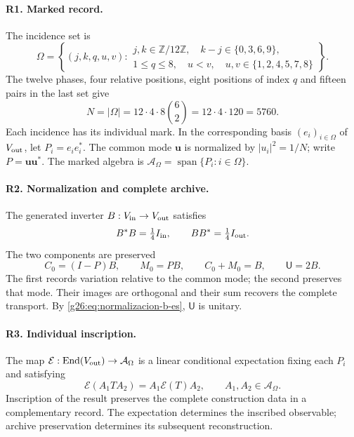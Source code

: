 \paragraph{R1. Marked record.}
The incidence set is
\begin{equation}
 \Omega=\left\{(j,k,q,u,v):
 \begin{array}{l}
 j,k\in\mathbb Z/12\mathbb Z,\quad k-j\in\{0,3,6,9\},\\
 1\leq q\leq8,\quad u<v,\quad
 u,v\in\{1,2,4,5,7,8\}
 \end{array}\right\}.
 \label{g26:eq:omega-rigidez-es}
\end{equation}
The twelve phases, four relative positions, eight positions of index \(q\) and fifteen pairs in the last set give
\begin{equation}
 N=|\Omega|=12\cdot4\cdot8\binom62
   =12\cdot4\cdot120=5760.
 \label{g26:eq:cardinal-rigidez-es}
\end{equation}
Each incidence has its individual mark. In the corresponding basis \((e_i)_{i\in\Omega}\) of \(V_{\rm out}\), let \(P_i=e_ie_i^*\). The common mode \(\boldsymbol u\) is normalized by \(|u_i|^2=1/N\); write \(P=\boldsymbol u\boldsymbol u^*\). The marked algebra is \(\mathcal A_\Omega=\operatorname{span}\{P_i:i\in\Omega\}\).

\paragraph{R2. Normalization and complete archive.}
The generated inverter \(B:V_{\rm in}\to V_{\rm out}\) satisfies
\begin{equation}
 B^*B=\tfrac14 I_{\rm in},\qquad
 BB^*=\tfrac14 I_{\rm out}.
 \label{g26:eq:normalizacion-b-es}
\end{equation}
The two components are preserved
\begin{equation}
 C_0=(I-P)B,\qquad M_0=PB,\qquad
 C_0+M_0=B,\qquad \mathsf U=2B.
 \label{g26:eq:archivo-completo-es}
\end{equation}
The first records variation relative to the common mode; the second preserves that mode. Their images are orthogonal and their sum recovers the complete transport. By \eqref{g26:eq:normalizacion-b-es}, \(\mathsf U\) is unitary.

\paragraph{R3. Individual inscription.}
The map \(\mathcal E:\operatorname{End}(V_{\rm out})\to\mathcal A_\Omega\) is a linear conditional expectation fixing each \(P_i\) and satisfying
\begin{equation}
 \mathcal E(A_1TA_2)=A_1\mathcal E(T)A_2,
 \qquad A_1,A_2\in\mathcal A_\Omega.
 \label{g26:eq:bimodularidad-es}
\end{equation}
Inscription of the result preserves the complete construction data in a complementary record. The expectation determines the inscribed observable; archive preservation determines its subsequent reconstruction.

